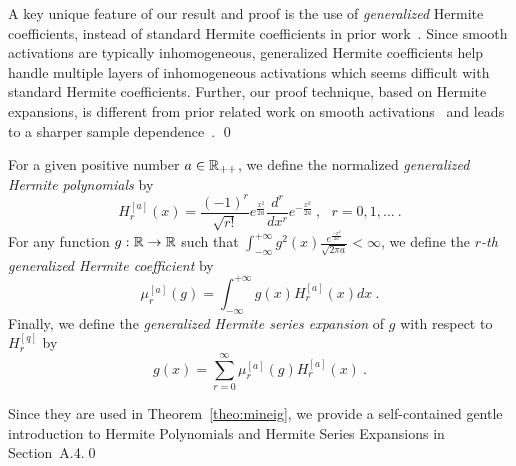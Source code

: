 \begin{remark}
A key unique feature of our result and proof is the use of {\em generalized} Hermite coefficients, instead of standard Hermite coefficients in prior work~\citep{oymak2020hermite,ng2020hermite1,ng2021hermite2}. Since smooth activations are typically inhomogeneous, generalized Hermite coefficients help handle multiple layers of inhomogeneous activations which seems difficult with standard Hermite coefficients. Further, our proof technique, based on Hermite expansions, is different from prior related work on smooth activations~\citep{SD-JL-HL-LW-XZ:19} and leads to a sharper sample dependence~. 
\qed 
\end{remark}

\begin{definition}
For a given positive number $a \in\mathbb{R}_{++}$,  we define the normalized \emph{generalized Hermite polynomials} by \begin{equation}
H^{[a]}_r(x)=\frac{(-1)^r}{\sqrt{r!}}e^{\frac{x^2}{2a}}\frac{d^r}{dx^r}e^{-\frac{x^2}{2a}}~, ~~~ r=0,1,\dots~. 
\end{equation}
For any function $g:\mathbb{R}\to\mathbb{R}$ such that $\int^{+\infty}_{-\infty}g^2(x)\frac{e^{\frac{-x^2}{2a}}}{\sqrt{2\pi a}}<\infty$, we define the \emph{$r$-th generalized Hermite coefficient} by \begin{equation}
\mu_r^{[a]}(g)=\int^{+\infty}_{-\infty}g(x)H^{[a]}_r(x) dx~. 
\end{equation}
Finally, we define the \emph{generalized Hermite series expansion} of $g$ with respect to $H^{[q]}_r$ by 
\begin{equation}
g(x)=\sum^{\infty}_{r=0}\mu^{[a]}_r(g)H^{[a]}_r(x)~.
\end{equation}
\end{definition}

%

\begin{remark}
Since they are used in Theorem~\ref{theo:mineig}, we provide a self-contained gentle introduction to Hermite Polynomials and Hermite Series Expansions in Section~A.4.\qed
\end{remark}

